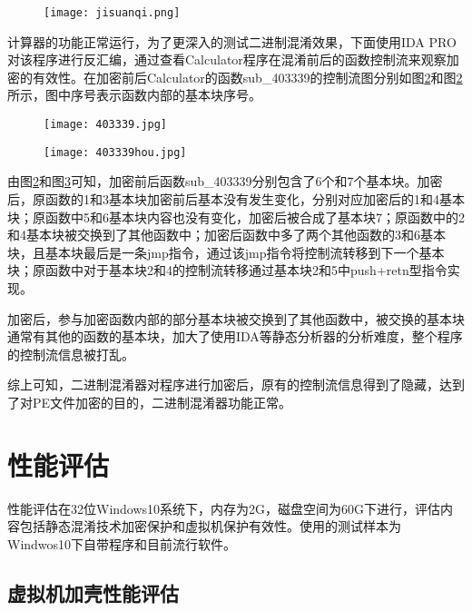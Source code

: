 \begin{figure}[htbp]
	\centering
	\texttt{[image: jisuanqi.png]}
	\label{jisuanqi}
\end{figure}

计算器的功能正常运行，为了更深入的测试二进制混淆效果，下面使用IDA PRO对该程序进行反汇编，通过查看Calculator程序在混淆前后的函数控制流来观察加密的有效性。在加密前后Calculator的函数sub\_403339的控制流图分别如图\ref{403339}和图\ref{403339}所示，图中序号表示函数内部的基本块序号。
\begin{figure}[htbp]
	\centering
	\texttt{[image: 403339.jpg]}
	\label{403339}
\end{figure}
\begin{figure}[htbp]
	\centering
	\texttt{[image: 403339hou.jpg]}
	\label{403339hou}
\end{figure}

由图\ref{403339}和图\ref{403339hou}可知，加密前后函数sub\_403339分别包含了6个和7个基本块。加密后，原函数的1和3基本块加密前后基本没有发生变化，分别对应加密后的1和4基本块；原函数中5和6基本块内容也没有变化，加密后被合成了基本块7；原函数中的2和4基本块被交换到了其他函数中；加密后函数中多了两个其他函数的3和6基本块，且基本块最后是一条jmp指令，通过该jmp指令将控制流转移到下一个基本块；原函数中对于基本块2和4的控制流转移通过基本块2和5中push+retn型指令实现。

加密后，参与加密函数内部的部分基本块被交换到了其他函数中，被交换的基本块通常有其他的函数的基本块，加大了使用IDA等静态分析器的分析难度，整个程序的控制流信息被打乱。

综上可知，二进制混淆器对程序进行加密后，原有的控制流信息得到了隐藏，达到了对PE文件加密的目的，二进制混淆器功能正常。

\section{性能评估}

性能评估在32位Windows10系统下，内存为2G，磁盘空间为60G下进行，评估内容包括静态混淆技术加密保护和虚拟机保护有效性。使用的测试样本为Windwos10下自带程序和目前流行软件。

\subsection{虚拟机加壳性能评估}

